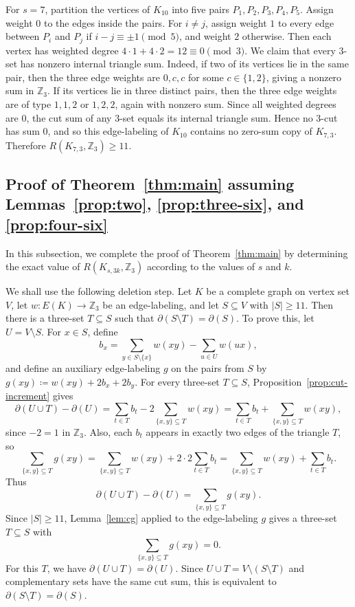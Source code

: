 ﻿\documentclass[11pt]{article}
\numberwithin{equation}{section}
\theoremstyle{remark}
\newcommand{\Z}{\mathbb Z}
\begin{document}
For \(s=7\), partition the vertices of \(K_{10}\) into five pairs \(P_1,P_2,P_3,P_4,P_5.\)
Assign weight \(0\) to the edges inside the pairs. For \(i\ne j\), assign weight \(1\) to every edge between \(P_i\) and \(P_j\) if \(i-j\equiv \pm1 \pmod 5\), and weight \(2\) otherwise. Then each vertex has weighted degree
\(4\cdot 1+4\cdot 2=12\equiv 0 \pmod 3.\)
We claim that every \(3\)-set has nonzero internal triangle sum. Indeed, if two of its vertices lie in the same pair, then the three edge weights are \(0,c,c\) for some \(c\in\{1,2\}\), giving a nonzero sum in \(\mathbb Z_3\). If its vertices lie in three distinct pairs, then the three edge weights are of type \(1,1,2\) or \(1,2,2\), again with nonzero sum. Since all weighted degrees are $0$, the cut sum of any \(3\)-set equals its internal triangle sum. Hence no \(3\)-cut has sum $0$, and so this edge-labeling of \(K_{10}\) contains no zero-sum copy of \(K_{7,3}\). Therefore \(R(K_{7,3},\Z_3)\ge11.\)


\subsection{Proof of Theorem~\ref{thm:main} assuming Lemmas~\ref{prop:two}, \ref{prop:three-six}, and \ref{prop:four-six}}\label{Subsec:pf main}
In this subsection, we complete the proof of Theorem~\ref{thm:main} by determining the exact value of $R(K_{s,3k},\Z_3)$ according to the values of $s$ and $k.$

We shall use the following deletion step.  Let $K$ be a complete graph on vertex set $V$, let $w\colon E(K)\to\Z_3$ be an edge-labeling, and let $S\subseteq V$ with $|S|\ge11$.  Then there is a three-set $T\subseteq S$ such that $\partial(S\setminus T)=\partial(S)$.
To prove this, let $U=V\setminus S$.
For $x\in S$, define
\[
    b_x=\sum_{y\in S\setminus\{x\}}w(xy)-\sum_{u\in U}w(ux),
\]
and define an auxiliary edge-labeling $g$ on the pairs from $S$ by $g(xy)\coloneqq w(xy)+2b_x+2b_y$.
For every three-set $T\subseteq S$, Proposition~\ref{prop:cut-increment} gives
\[
    \partial(U\cup T)-\partial(U)
    =\sum_{t\in T}b_t-2\sum_{\{x,y\}\subseteq T}w(xy)
    =\sum_{t\in T}b_t+\sum_{\{x,y\}\subseteq T}w(xy),
\]
since $-2=1$ in $\Z_3$.  Also, each $b_t$ appears in exactly two edges of the triangle $T$, so
\[
    \sum_{\{x,y\}\subseteq T}g(xy)
    =\sum_{\{x,y\}\subseteq T}w(xy)+2\cdot2\sum_{t\in T}b_t
    =\sum_{\{x,y\}\subseteq T}w(xy)+\sum_{t\in T}b_t.
\]
Thus
\[
    \partial(U\cup T)-\partial(U)
    =\sum_{\{x,y\}\subseteq T}g(xy).
\]
Since $|S|\ge11$, Lemma~\ref{lem:cg} applied to the edge-labeling $g$ gives a three-set $T\subseteq S$ with
\[
    \sum_{\{x,y\}\subseteq T}g(xy)=0.
\]
For this $T$, we have $\partial(U\cup T)=\partial(U)$.  Since $U\cup T=V\setminus(S\setminus T)$ and complementary sets have the same cut sum, this is equivalent to $\partial(S\setminus T)=\partial(S)$.
\end{document}
